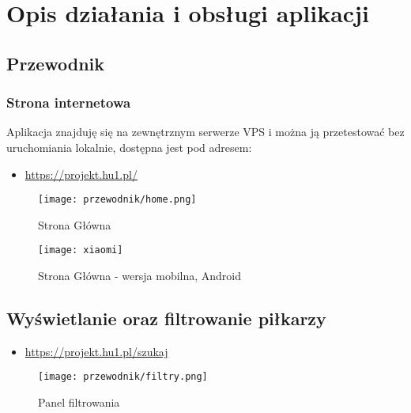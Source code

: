 \section{Opis działania i obsługi aplikacji}
    \subsection{Przewodnik}

        \subsubsection{Strona internetowa}
            Aplikacja znajduję się na zewnętrznym serwerze VPS i można ją przetestować bez uruchomiania lokalnie, dostępna jest pod adresem:
            \begin{itemize}
                \item \url{https://projekt.hu1.pl/}
            \end{itemize}

            \begin{figure}[!htb]
                \centering
                \texttt{[image: przewodnik/home.png]}
                \caption{Strona Główna}                
            \end{figure}

            \pagebreak

            \begin{figure}[!htb]
                \centering
                \texttt{[image: xiaomi]}
                \caption{Strona Główna - wersja mobilna, Android}                
            \end{figure}
        \subsection{Wyświetlanie oraz filtrowanie piłkarzy}

        \begin{itemize}
            \item \url{https://projekt.hu1.pl/szukaj}
        \end{itemize}

            \begin{figure}[!htb]
                \centering
                \texttt{[image: przewodnik/filtry.png]}
                \caption{Panel filtrowania}                
            \end{figure}
        
